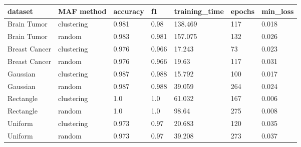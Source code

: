 \begin{tabular}{lllllll}
\toprule
dataset & MAF method & accuracy & f1 & training_time & epochs & min_loss \\
\midrule
Brain Tumor & clustering & 0.981 & 0.98 & 138.469 & 117 & 0.018 \\
Brain Tumor & random & 0.983 & 0.981 & 157.075 & 132 & 0.026 \\
Breast Cancer & clustering & 0.976 & 0.966 & 17.243 & 73 & 0.023 \\
Breast Cancer & random & 0.976 & 0.966 & 19.63 & 117 & 0.031 \\
Gaussian & clustering & 0.987 & 0.988 & 15.792 & 100 & 0.017 \\
Gaussian & random & 0.987 & 0.988 & 39.059 & 264 & 0.024 \\
Rectangle & clustering & 1.0 & 1.0 & 61.032 & 167 & 0.006 \\
Rectangle & random & 1.0 & 1.0 & 98.64 & 275 & 0.008 \\
Uniform & clustering & 0.973 & 0.97 & 20.683 & 120 & 0.035 \\
Uniform & random & 0.973 & 0.97 & 39.208 & 273 & 0.037 \\
\bottomrule
\end{tabular}

